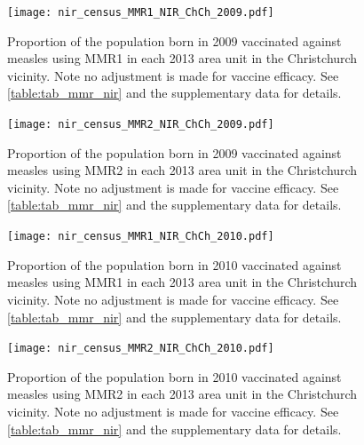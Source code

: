 \documentclass{article}
\begin{document}
\begin{figure}
\begin{center}
    \texttt{[image: nir\_census\_MMR1\_NIR\_ChCh\_2009.pdf]}
 \end{center}
    \caption{Proportion of the population born in 2009 vaccinated against measles using MMR1 in each 2013 area unit in the Christchurch vicinity. Note no adjustment is made for vaccine efficacy. See \autoref{table:tab_mmr_nir} and the supplementary data for details.}
\label{fig:fig12009_c}
\end{figure}


\begin{figure}
\begin{center}
    \texttt{[image: nir\_census\_MMR2\_NIR\_ChCh\_2009.pdf]}
 \end{center}
    \caption{Proportion of the population born in 2009 vaccinated against measles using MMR2 in each 2013 area unit in the Christchurch vicinity. Note no adjustment is made for vaccine efficacy. See \autoref{table:tab_mmr_nir} and the supplementary data for details.}
\label{fig:fig22009_c}
\end{figure}


\begin{figure}
\begin{center}
    \texttt{[image: nir\_census\_MMR1\_NIR\_ChCh\_2010.pdf]}
\end{center}
    \caption{Proportion of the population born in 2010 vaccinated against measles using MMR1 in each 2013 area unit in the Christchurch vicinity. Note no adjustment is made for vaccine efficacy. See \autoref{table:tab_mmr_nir} and the supplementary data for details.}
\label{fig:fig12010_c}
\end{figure}


\begin{figure}
\begin{center}
    \texttt{[image: nir\_census\_MMR2\_NIR\_ChCh\_2010.pdf]}
 \end{center}
    \caption{Proportion of the population born in 2010 vaccinated against measles using MMR2 in each 2013 area unit in the Christchurch vicinity. Note no adjustment is made for vaccine efficacy. See \autoref{table:tab_mmr_nir} and the supplementary data for details.}
\label{fig:fig22010_c}
\end{figure}
\end{document}
